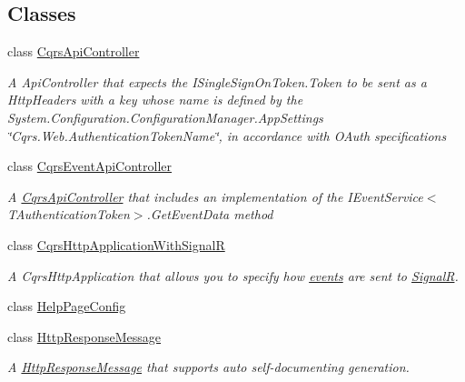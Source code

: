 \subsection*{Classes}
\begin{DoxyCompactItemize}
\item 
class \hyperlink{classCqrs_1_1WebApi_1_1CqrsApiController}{Cqrs\+Api\+Controller}
\begin{DoxyCompactList}\small\item\em A Api\+Controller that expects the I\+Single\+Sign\+On\+Token.\+Token to be sent as a Http\+Headers with a key whose name is defined by the System.\+Configuration.\+Configuration\+Manager.\+App\+Settings \char`\"{}\+Cqrs.\+Web.\+Authentication\+Token\+Name\char`\"{}, in accordance with O\+Auth specifications \end{DoxyCompactList}\item 
class \hyperlink{classCqrs_1_1WebApi_1_1CqrsEventApiController}{Cqrs\+Event\+Api\+Controller}
\begin{DoxyCompactList}\small\item\em A \hyperlink{classCqrs_1_1WebApi_1_1CqrsApiController}{Cqrs\+Api\+Controller} that includes an implementation of the I\+Event\+Service$<$\+T\+Authentication\+Token$>$.\+Get\+Event\+Data method \end{DoxyCompactList}\item 
class \hyperlink{classCqrs_1_1WebApi_1_1CqrsHttpApplicationWithSignalR}{Cqrs\+Http\+Application\+With\+SignalR}
\begin{DoxyCompactList}\small\item\em A Cqrs\+Http\+Application that allows you to specify how \hyperlink{}{events} are sent to \hyperlink{namespaceCqrs_1_1WebApi_1_1SignalR}{SignalR}. \end{DoxyCompactList}\item 
class \hyperlink{classCqrs_1_1WebApi_1_1HelpPageConfig}{Help\+Page\+Config}
\item 
class \hyperlink{classCqrs_1_1WebApi_1_1HttpResponseMessage}{Http\+Response\+Message}
\begin{DoxyCompactList}\small\item\em A \hyperlink{classCqrs_1_1WebApi_1_1HttpResponseMessage}{Http\+Response\+Message} that supports auto self-\/documenting generation. \end{DoxyCompactList}\end{DoxyCompactItemize}
